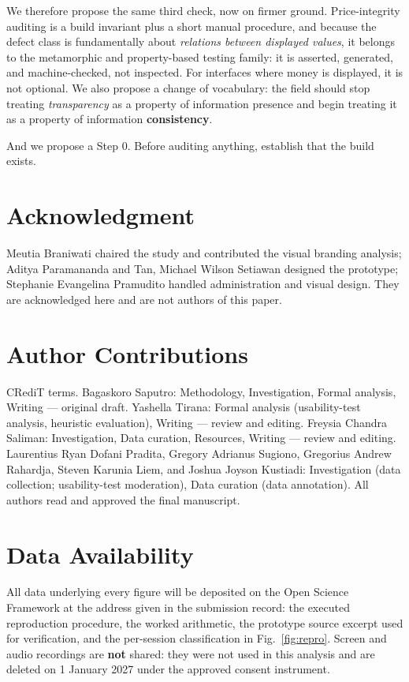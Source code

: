 \documentclass[conference]{IEEEtran}
\begin{document}
We therefore propose the same third check, now on firmer ground. Price-integrity auditing is a build
invariant plus a short manual procedure, and because the defect class is fundamentally about
\emph{relations between displayed values}, it belongs to the metamorphic and property-based testing
family: it is asserted, generated, and machine-checked, not inspected. For interfaces where money is
displayed, it is not optional. We also propose a change of vocabulary: the field should stop treating
\emph{transparency} as a property of information presence and begin treating it as a property of
information \textbf{consistency}.

And we propose a Step 0. Before auditing anything, establish that the build exists.

\section*{Acknowledgment}

Meutia Braniwati chaired the study and contributed the visual branding analysis; Aditya Paramananda and
Tan, Michael Wilson Setiawan designed the prototype; Stephanie Evangelina Pramudito handled
administration and visual design. They are acknowledged here and are not authors of this paper.

\section*{Author Contributions}

CRediT terms. Bagaskoro Saputro: Methodology, Investigation, Formal analysis, Writing --- original
draft. Yashella Tirana: Formal analysis (usability-test analysis, heuristic evaluation), Writing ---
review and editing. Freysia Chandra Saliman: Investigation, Data curation, Resources, Writing --- review
and editing. Laurentius Ryan Dofani Pradita, Gregory Adrianus Sugiono, Gregorius Andrew Rahardja, Steven
Karunia Liem, and Joshua Joyson Kustiadi: Investigation (data collection; usability-test moderation),
Data curation (data annotation). All authors read and approved the final manuscript.

\section*{Data Availability}

All data underlying every figure will be deposited on the Open Science Framework at the address given in
the submission record: the executed reproduction procedure, the worked arithmetic, the prototype source
excerpt used for verification, and the per-session classification in Fig.~\ref{fig:repro}. Screen and
audio recordings are \textbf{not} shared: they were not used in this analysis and are deleted on
1 January 2027 under the approved consent instrument.
\end{document}
